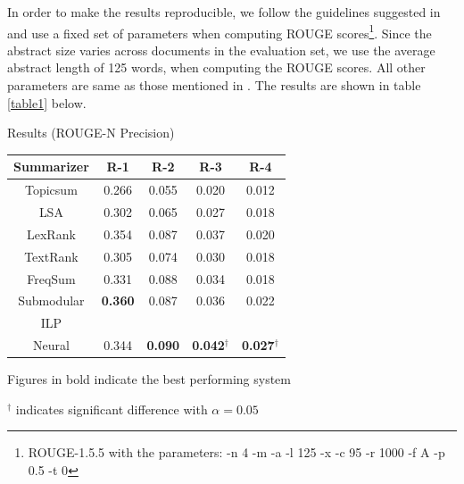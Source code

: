 In order to make the results reproducible, we follow the guidelines suggested in \cite{hong2014repository} and use a fixed set of parameters when computing ROUGE scores\footnote{ROUGE-1.5.5 with the parameters: -n 4 -m -a -l 125 -x -c 95 -r 1000 -f A -p 0.5 -t 0}. Since the abstract size varies across documents in the evaluation set, we use the average abstract length of 125 words, when computing the ROUGE scores. All other parameters are same as those mentioned in \cite{hong2014repository}.  The results are shown in table \ref{table1} below.\\
\vspace{-5mm}
\begin{center}
	\begin{threeparttable}[H]
	\centering
	\caption{Results (ROUGE-N Precision)}
	\begin{tabular}{|c|c|c|c|c|}
		\hline
		Summarizer &      R-1       &      R-2       &           R-3            &           R-4            \\ \hline
		 Topicsum  &     0.266      &     0.055      &          0.020           &          0.012           \\
		   LSA     &     0.302      &     0.065      &          0.027           &          0.018           \\
		 LexRank   &     0.354      &     0.087      &          0.037           &          0.020           \\
		 TextRank  &     0.305      &     0.074      &          0.030           &          0.018           \\
		 FreqSum   &     0.331      &     0.088      &          0.034           &          0.018           \\
		Submodular & \textbf{0.360} &     0.087      &          0.036           &          0.022           \\
		   ILP     &                &                &                          &  \\
		  Neural   &     0.344      & \textbf{0.090} & \textbf{0.042}$^\dagger$ & \textbf{0.027}$^\dagger$ \\ \hline
	\end{tabular}
	\begin{tablenotes}
	\small
	\item Figures in bold indicate the best performing system
	\item ${^\dagger}$ indicates significant difference with $\alpha=0.05$\\
	\end{tablenotes}
\label{table1}

\end{threeparttable}
\end{center}

